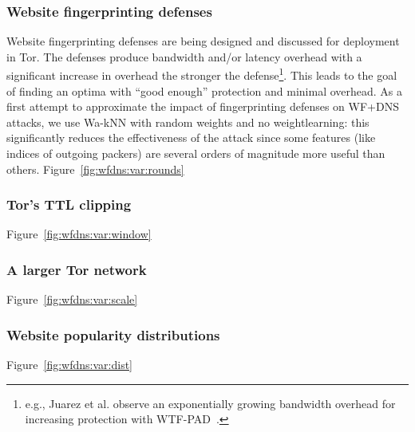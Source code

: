 \subsubsection{Website fingerprinting defenses}
Website fingerprinting defenses are being
designed and discussed for deployment in Tor.
The defenses produce bandwidth and/or latency overhead with a significant
increase in overhead the stronger the defense\footnote{e.g., Juarez et al.
observe an exponentially growing bandwidth overhead for increasing protection
with WTF-PAD~\cite{DBLP:journals/corr/JuarezIPDW15}.}.
This leads to the goal of finding an optima with ``good enough''
protection and minimal overhead.
As a first attempt to approximate the impact of fingerprinting
defenses on WF+DNS attacks, we use Wa-kNN with
random weights and no weightlearning: this significantly reduces the
effectiveness of the attack since some features (like indices of outgoing
packers) are several orders of magnitude more useful than others.
Figure~\ref{fig:wfdns:var:rounds}

\subsubsection{Tor's TTL clipping}
Figure~\ref{fig:wfdns:var:window}

\subsubsection{A larger Tor network}
Figure~\ref{fig:wfdns:var:scale}

\subsubsection{Website popularity distributions}
Figure~\ref{fig:wfdns:var:dist}



